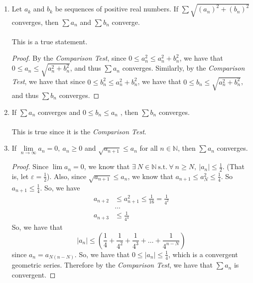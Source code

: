 \documentclass[12pt,letterpaper]{article}
\newcommand{\limx}[2]{\displaystyle\lim\limits_{#1 \to #2}}
\newcommand{\st}{\ \text{s.t.}\ }
\newcommand{\N}{\mathbb{N}}
\theoremstyle{case}
\theoremstyle{definition}
\begin{document}
\begin{enumerate}
\begin{enumerate}
			\item Let $a_k$ and $b_k$ be sequences of positive real numbers. If $\sum \sqrt{(a_n)^2 + (b_n)^2}$ converges, then $\sum a_n$ and $\sum b_n$ converge.
			\\\\This is a true statement.
			\begin{proof}
				By the \textit{Comparison Test}, since $0 \leq a_n^2 \leq a_n^2+b_n^2$, we have that $0 \leq a_n \leq \sqrt{a_n^2+b_n^2}$, and thus $\sum a_n$ converges. Similarly, by the \textit{Comparison Test}, we have that since $0 \leq b_n^2 \leq a_n^2+b_n^2$, we have that $0 \leq b_n \leq \sqrt{a_n^2+b_n^2}$, and thus $\sum b_n$ converges.
			\end{proof}
			
			\item If $\sum a_n$ converges and $0 \leq b_n \leq a_n$ , then $\sum b_n$ converges.
			\\\\This is true since it is the \textit{Comparison Test}.\\
			
			\item If $\limx{n}{\infty} a_n=0,\ a_n \geq 0$ and $\sqrt{a_{n+1}} \leq a_n$ for all $n \in \N$, then $\sum a_n$ converges.
			\begin{proof}
				Since $\lim a_n = 0$, we know that $\exists\ N \in \N \st \forall\ n \geq N,\ |a_n|\leq \frac{1}{2}$. (That is, let $\varepsilon = \frac{1}{2}$). Also, since $\sqrt{a_{n+1}} \leq a_n$, we know that $a_{n+1} \leq a_N^2 \leq \frac{1}{4}$. So $a_{n+1} \leq \frac{1}{4}$. So, we have
				\begin{align*}
					a_{n+2} &\leq a_{n+1}^2\leq \frac{1}{16} = \frac{1}{4^2} \\
					&\dots \\
					a_{n+3} &\leq \frac{1}{4^4}
				\end{align*}
				So, we have that
				\[|a_n| \leq \left(\frac{1}{4}+\frac{1}{4^2}+\frac{1}{4^3}+\dots+\frac{1}{4^{n-N}}\right)\]
				since $a_n=a_{N(n-N)}$. So, we have that $0 \leq |a_n| \leq \frac{1}{4}$, which is a convergent geometric series. Therefore by the \textit{Comparison Test}, we have that $\sum a_n$ is convergent.
			\end{proof}
		\end{enumerate}
	\end{enumerate}
\end{document}
